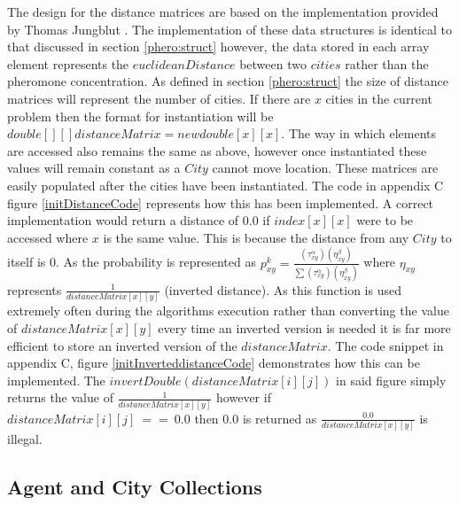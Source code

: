 The design for the distance matrices are based on the implementation provided by Thomas Jungblut \cite{tjung:aco:blog}. The implementation of these data structures is identical to that discussed in section \ref{phero:struct} however, the data stored in each array element represents the $euclideanDistance$ between two $cities$ rather than the pheromone concentration. As defined in section \ref{phero:struct} the size of distance matrices will represent the number of cities. If there are $x$ cities in the current problem then the format for instantiation will be $double[][] distanceMatrix = new double[x][x]$. The way in which elements are accessed also remains the same as above, however once instantiated these values will remain constant as a $City$ cannot move location. These matrices are easily populated after the cities have been instantiated. The code in appendix C figure \ref{initDistanceCode} represents how this has been implemented. A correct implementation would return a distance of $0.0$ if $index[x][x]$ were to be accessed where $x$ is the same value. This is because the distance from any $City$ to itself is 0.
As the probability is represented as $p_{xy}^{k} = \frac{(\tau_{xy}^{\alpha })(\eta _{xy}^{\beta })}{\sum (\tau_{xy}^{\alpha })(\eta _{xy}^{\beta })}$ where $\eta _{xy}$ represents $\frac{1}{distanceMatrix[x][y]}$ (inverted distance). As this function is used extremely often during the algorithms execution rather than converting the value of $distanceMatrix[x][y]$ every time an inverted version is needed it is far more efficient to store an inverted version of the $distanceMatrix$. The code snippet in appendix C, figure \ref{initInverteddistanceCode} demonstrates how this can be implemented. The $invertDouble(distanceMatrix[i][j])$ in said figure simply returns the value of $\frac{1}{distanceMatrix[x][y]}$ however if $distanceMatrix[i][j]\ ==\ 0.0$ then $0.0$ is returned as $\frac{0.0}{distanceMatrix[x][y]}$ is illegal.
  
\subsection{Agent and City Collections}

